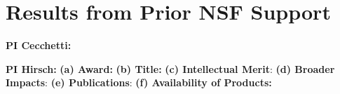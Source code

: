 \section{Results from Prior NSF Support}
\label{sec:prior_results}

\noindent\textbf{PI Cecchetti:}

\noindent
\textbf{PI Hirsch:}
\textbf{(a) Award:} 
\textbf{(b) Title:} 
\textbf{(c) Intellectual Merit}:  
\textbf{(d) Broader Impacts}:  
\textbf{(e) Publications}:
\textbf{(f) Availability of Products:} 

